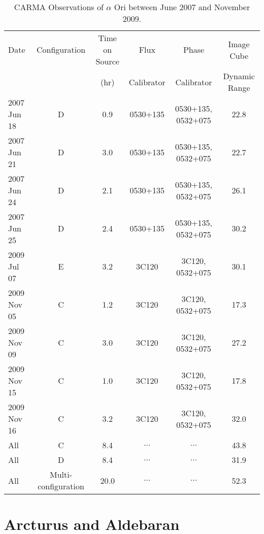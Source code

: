 \begin{landscape}
\begin{table}[!ht]
\begin{center}
\caption[CARMA Observations of $\alpha$ Ori.]
{CARMA Observations of $\alpha$ Ori between June 2007 and November 2009.}
\begin{tabular}{lccccc}
\hline
\hline
\rule{0pt}{2.5ex}Date & Configuration & Time on Source & Flux		& Phase 	& Image Cube \\
	 & 				 &  (hr)		  & Calibrator	& Calibrator& Dynamic Range \\
\hline
\rule{0pt}{2.5ex}2007 Jun 18 	& D & 0.9 & 0530+135	& 0530+135, 0532+075 	&  22.8 \\
2007 Jun 21 	& D & 3.0 & 0530+135	& 0530+135, 0532+075 	&  22.7 \\
2007 Jun 24 	& D & 2.1 & 0530+135	& 0530+135, 0532+075 	&  26.1 \\
2007 Jun 25 	& D & 2.4 & 0530+135	& 0530+135, 0532+075 	&  30.2 \\
2009 Jul 07	& E & 3.2 & 3C120 		& 3C120, 0532+075	& 30.1 \\
2009 Nov 05	& C & 1.2 & 3C120 		& 3C120, 0532+075 	& 17.3 \\
2009 Nov 09 	& C & 3.0 & 3C120 		& 3C120, 0532+075 	& 27.2 \\
2009 Nov 15	& C & 1.0 & 3C120 		& 3C120, 0532+075 	& 17.8 \\
2009 Nov 16	& C & 3.2 & 3C120 		& 3C120, 0532+075 	& 32.0  \\
All		& C & 8.4	&  $\dots$	& 	$\dots$	& 43.8 \\
All 		& D & 8.4 &  $\dots$	&  	$\dots$	& 31.9 \\
All 		& Multi-configuration & 20.0 & $\dots$& $\dots$ 	& 52.3 \\
\hline
\end{tabular}
\label{tab:3.3}
\end{center}
\end{table}
\end{landscape}

\section{Arcturus and Aldebaran}\label{sec:3.4}

